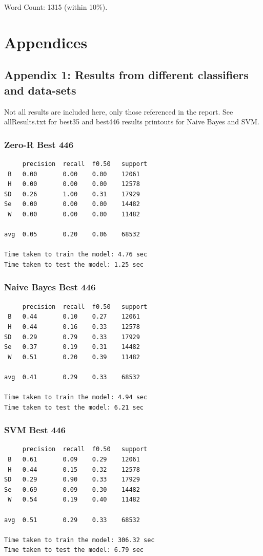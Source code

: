 \documentclass[twocolumn]{article}
\begin{document}
\hfill \break

\noindent Word Count: 1315 (within 10\%).

\vfill\eject
\printbibliography
\clearpage
\section{Appendices}
\subsection{Appendix 1: Results from different classifiers and data-sets}
Not all results are included here, only those referenced in the report. See allResults.txt for best35 and best446 results printouts for Naive Bayes and SVM.
\subsubsection{Zero-R Best 446}
\begin{verbatim}
     precision  recall  f0.50   support
 B   0.00       0.00    0.00    12061
 H   0.00       0.00    0.00    12578
SD   0.26       1.00    0.31    17929
Se   0.00       0.00    0.00    14482
 W   0.00       0.00    0.00    11482

avg  0.05       0.20    0.06    68532

Time taken to train the model: 4.76 sec
Time taken to test the model: 1.25 sec
\end{verbatim}
\subsubsection{Naive Bayes Best 446}
\begin{verbatim}
     precision  recall  f0.50   support
 B   0.44       0.10    0.27    12061
 H   0.44       0.16    0.33    12578
SD   0.29       0.79    0.33    17929
Se   0.37       0.19    0.31    14482
 W   0.51       0.20    0.39    11482

avg  0.41       0.29    0.33    68532

Time taken to train the model: 4.94 sec
Time taken to test the model: 6.21 sec
\end{verbatim}
\vfill\eject
\subsubsection{SVM Best 446}
\begin{verbatim}
     precision  recall  f0.50   support
 B   0.61       0.09    0.29    12061
 H   0.44       0.15    0.32    12578
SD   0.29       0.90    0.33    17929
Se   0.69       0.09    0.30    14482
 W   0.54       0.19    0.40    11482

avg  0.51       0.29    0.33    68532

Time taken to train the model: 306.32 sec
Time taken to test the model: 6.79 sec
\end{verbatim}
\end{document}
